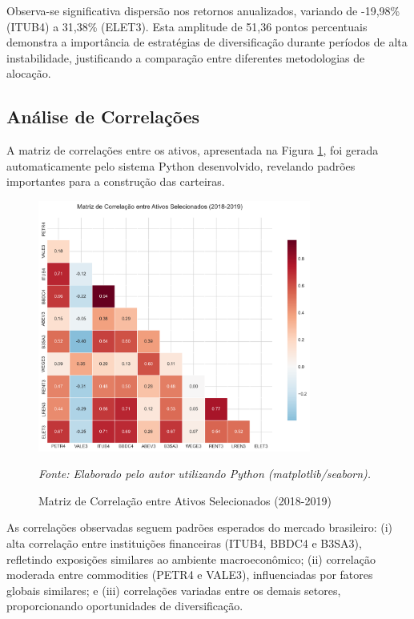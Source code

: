 Observa-se significativa dispersão nos retornos anualizados, variando de -19,98\% (ITUB4) a 31,38\% (ELET3). Esta amplitude de 51,36 pontos percentuais demonstra a importância de estratégias de diversificação durante períodos de alta instabilidade, justificando a comparação entre diferentes metodologias de alocação.

\subsection{Análise de Correlações}

A matriz de correlações entre os ativos, apresentada na Figura \ref{fig:correlation_matrix}, foi gerada automaticamente pelo sistema Python desenvolvido, revelando padrões importantes para a construção das carteiras.

\begin{figure}[H]
\centering
\includegraphics[width=0.8\textwidth]{images/correlation_matrix.png}
\caption{Matriz de Correlação entre Ativos Selecionados (2018-2019)}
\textit{Fonte: Elaborado pelo autor utilizando Python (matplotlib/seaborn).}
\label{fig:correlation_matrix}
\end{figure}

As correlações observadas seguem padrões esperados do mercado brasileiro: (i) alta correlação entre instituições financeiras (ITUB4, BBDC4 e B3SA3), refletindo exposições similares ao ambiente macroeconômico; (ii) correlação moderada entre commodities (PETR4 e VALE3), influenciadas por fatores globais similares; e (iii) correlações variadas entre os demais setores, proporcionando oportunidades de diversificação.

